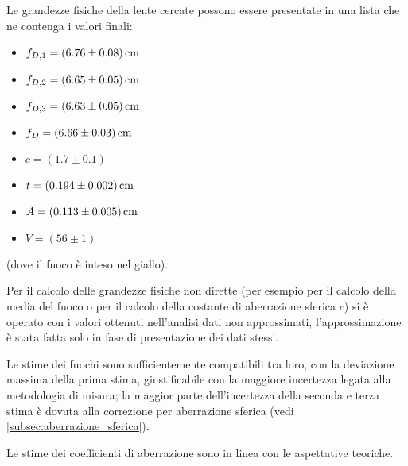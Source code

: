 Le grandezze fisiche della lente cercate possono essere presentate in una lista che ne contenga i valori finali:
\begin{itemize}
\item $f_{D,1} = (6.76 \pm 0.08) \,\mathrm{cm}$
\item $f_{D,2} = (6.65 \pm 0.05) \,\mathrm{cm}$
\item $f_{D,3} = (6.63 \pm 0.05) \,\mathrm{cm}$
\item $f_D = (6.66 \pm 0.03) \,\mathrm{cm}$
\item $c = (1.7 \pm 0.1)$
\item $t = (0.194 \pm 0.002) \,\mathrm{cm}$
\item $A = (0.113 \pm 0.005) \,\mathrm{cm}$
\item $V = (56 \pm 1)$  
\end{itemize}
(dove il fuoco \`e inteso nel giallo).

Per il calcolo delle grandezze fisiche non dirette (per esempio per il calcolo della media del fuoco o per il calcolo della costante di aberrazione sferica $c$) si \`e operato con i valori ottenuti nell'analisi dati non approssimati, l'approssimazione \`e stata fatta solo in fase di presentazione dei dati stessi.

Le stime dei fuochi sono sufficientemente compatibili tra loro, con la deviazione massima della prima stima, giustificabile con la maggiore incertezza legata alla metodologia di misura; la maggior parte dell'incertezza della seconda e terza stima \`e dovuta alla correzione per aberrazione sferica (vedi \autoref{subsec:aberrazione_sferica}).

Le stime dei coefficienti di aberrazione sono in linea con le aspettative teoriche.
